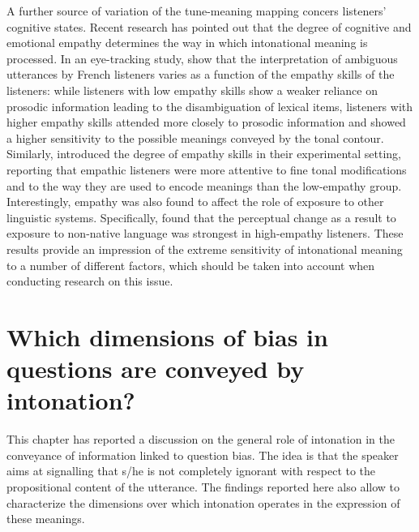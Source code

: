 \documentclass[output=paper,colorlinks,citecolor=brown]{langscibook}
\begin{document}
A further source of variation of the tune-meaning mapping concers listeners' cognitive states. Recent research has pointed out that the degree of cognitive and emotional empathy determines the way in which intonational meaning is processed. In an eye-tracking study, \citet{esteveetal2020} show that the interpretation of ambiguous utterances by French listeners varies as a function of the empathy skills of the listeners: while listeners with low empathy skills show a weaker reliance on prosodic information leading to the disambiguation of lexical items, listeners with higher empathy skills attended more closely to prosodic information and showed a higher sensitivity to the possible meanings conveyed by the tonal contour. Similarly, \citet{Orrico+2020} introduced the degree of empathy skills in their experimental setting, reporting that empathic listeners were more attentive to fine tonal modifications and to the way they are used to encode meanings than the low-empathy group. Interestingly, empathy was also found to affect the role of exposure to other linguistic systems. Specifically, \citet{Orrico+2020} found that the perceptual change as a result to exposure to non-native language was strongest in high-empathy listeners. These results provide an impression of the extreme sensitivity of intonational meaning to a number of different factors, which should be taken into account when conducting research on this issue.

\section{Which dimensions of bias in questions are conveyed by intonation?}\label{sec:04:5}
This chapter has reported a discussion on the general role of intonation in the conveyance of information linked to question bias. The idea is that the speaker aims at signalling that s/he is not completely ignorant with respect to the propositional content of the utterance. The findings reported here also allow to characterize the dimensions over which intonation operates in the expression of these meanings.
\end{document}
